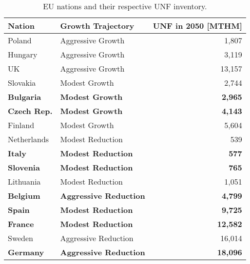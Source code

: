 \begin{table}[h]
    \centering
    \caption {\gls{EU} nations and their respective \gls{UNF} inventory.} 
                \begin{tabularx}{\textwidth}{llr}
                    \hline 
                    \textbf{Nation} & \textbf{Growth Trajectory} & \small{\textbf{UNF in 2050 [MTHM] }}\\
                    \hline
                    Poland & Aggressive Growth & 1,807\\
                    Hungary & Aggressive Growth & 3,119 \\ 
                    UK & Aggressive Growth & 13,157\\
                    Slovakia & Modest Growth & 2,744\\
                    \textbf{Bulgaria} & \textbf{Modest Growth} & \textbf{2,965} \\
                    \textbf{Czech Rep.} & \textbf{Modest Growth} & \textbf{4,143}\\
                    Finland & Modest Growth &  5,604\\
                    Netherlands & Modest Reduction & 539\\
                    \textbf{Italy} & \textbf{Modest Reduction} & \textbf{577}\\
                    \textbf{Slovenia} & \textbf{Modest Reduction} & \textbf{765}\\
                    Lithuania & Modest Reduction & 1,051 \\
                    \textbf{Belgium} & \textbf{Aggressive Reduction} & \textbf{4,799}\\
                    \textbf{Spain} & \textbf{Modest Reduction} &  \textbf{9,725} \\
                    \textbf{France} & \textbf{Modest Reduction} & \textbf{12,582} \\
                    Sweden & Aggressive Reduction & 16,014\\
                    \textbf{Germany} & \textbf{Aggressive Reduction} & \textbf{18,096}\\
                    \hline
                \end{tabularx}
    
    \label{tab:which_send}

\end{table}

